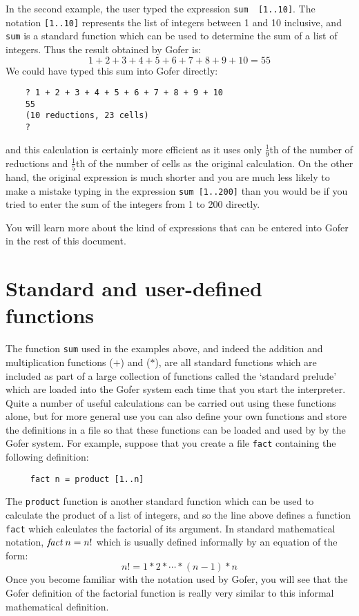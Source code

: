 In the second example, the user typed  the  expression  \verb"sum  [1..10]".
The notation \verb"[1..10]" represents the list of integers between 1 and 10
inclusive, and \verb"sum" is a  standard  function  which  can  be  used  to
determine the sum of a list of integers.  Thus the result  obtained  by
Gofer is:
\[
          1 + 2 + 3 + 4 + 5 + 6 + 7 + 8 + 9 + 10  =  55
\]
We could have typed this sum into Gofer directly:
\begin{verbatim}
    ? 1 + 2 + 3 + 4 + 5 + 6 + 7 + 8 + 9 + 10
    55
    (10 reductions, 23 cells)
    ? 
\end{verbatim}
and this calculation is certainly more efficient as it uses only
$\frac{1}{9}$th of the number of reductions and 
$\frac{1}{5}$th of the number  of  cells  as  the
original calculation.  On the other hand, the  original  expression  is
much shorter and you are much less likely to make a mistake  typing  in
the expression \verb"sum [1..200]" than you would be if you tried  to  enter
the sum of the integers from 1 to 200 directly.

You will learn more about the kind of expressions that can  be  entered
into Gofer in the rest of this document.


\chapter{Standard and user-defined functions}

The function \verb"sum" used in the examples above, and indeed the  addition
and multiplication functions ($+$) and ($*$), are  all  standard  functions
which are included as part of a large collection  of  functions  called
the `standard prelude' which are loaded into the Gofer system each time
that you start the interpreter.  Quite a number of useful  calculations
can be carried out using these functions alone, but  for  more  general
use you can also define your own functions and store the definitions in
a file so that these functions can be loaded and used by by  the  Gofer
system.  For example, suppose that you create a file \verb"fact"  containing
the following definition:
\begin{verbatim}
     fact n = product [1..n]
\end{verbatim}
The \verb"product" function is another standard function which can  be  used
to calculate the product of a list of integers, and so the  line  above
defines a  function  \verb"fact"  which  calculates  the  factorial  of  its
argument.  In standard  mathematical notation,  $\mbox{{\it fact}}\; n = n!$   which  is
usually defined informally by an equation of the form:
\[
     n! = 1 * 2 * \cdots * (n-1) * n
\]
Once you become familiar with the notation used by Gofer, you will  see
that the Gofer definition of the  factorial  function  is  really  very
similar to this informal mathematical definition.

